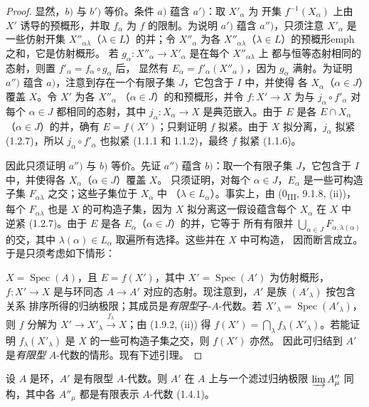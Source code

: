 \begin{proof}
显然，$b)$ 与 $b')$ 等价。条件 $a)$ 蕴含 $a')$：取 $X'_\alpha$ 为
开集 $f^{-1}(X_\alpha)$ 上由 $X'$ 诱导的预概形，并取 $f_\alpha$ 为 $f$
的限制。为说明 $a')$ 蕴含 $a'')$，只须注意 $X'_\alpha$ 是一些仿射开集
$X''_{\alpha\lambda}$（$\lambda\in L$）的并；令 $X''_\alpha$ 为各
$X''_{\alpha\lambda}$（$\lambda\in L$）的预概形emph{之和}，它是仿射概形。
若 $g_\alpha:X''_\alpha\to X'_\alpha$ 是在每个 $X''_{\alpha\lambda}$ 上
都与恒等态射相同的态射，则置 $f'_\alpha=f_\alpha\circ g_\alpha$ 后，
显然有 $E_\alpha=f'_\alpha(X''_\alpha)$，因为 $g_\alpha$ 满射。为证明
$a'')$ 蕴含 $a)$，注意到存在一个有限子集 $J$，它包含于 $I$ 中，并使得
各 $X_\alpha$（$\alpha\in J$）覆盖 $X$。令 $X'$ 为各 $X''_\alpha$
（$\alpha\in J$）的和预概形，并令 $f:X'\to X$ 为与
$j_\alpha\circ f'_\alpha$ 对每个 $\alpha\in J$ 都相同的态射，其中
$j_\alpha:X_\alpha\to X$ 是典范嵌入。由于 $E$ 是各 $E\cap X_\alpha$
（$\alpha\in J$）的并，确有 $E=f(X')$；只剩证明 $f$ 拟紧。由于 $X$
拟分离，$j_\alpha$ 拟紧 (1.2.7)，所以 $j_\alpha\circ f'_\alpha$ 也拟紧
(1.1.1 和 1.1.2)，最终 $f$ 拟紧 (1.1.6)。

因此只须证明 $a'')$ 与 $b)$ 等价。先证 $a'')$ 蕴含 $b)$：取一个有限子集
$J$，它包含于 $I$ 中，并使得各 $X_\alpha$（$\alpha\in J$）覆盖 $X$。
只须证明，对每个 $\alpha\in J$，$E_\alpha$ 是一些可构造子集
$F_{\alpha\lambda}$ 之交；这些子集位于 $X_\alpha$ 中
（$\lambda\in L_\alpha$）。事实上，由
(0\textsubscript{III}, 9.1.8, (ii))，每个 $F_{\alpha\lambda}$ 也是 $X$
的可构造子集，因为 $X$ 拟分离这一假设蕴含每个 $X_\alpha$ 在 $X$ 中
逆紧 (1.2.7)。由于 $E$ 是各 $E_\alpha$（$\alpha\in J$）的并，它等于
所有有限并 $\bigcup_{\alpha\in J}F_{\alpha,\lambda(\alpha)}$ 的交，其中
$\lambda(\alpha)\in L_\alpha$ 取遍所有选择。这些并在 $X$ 中可构造，
因而断言成立。于是只须考虑如下情形：


$X=\operatorname{Spec}(A)$，且 $E=f(X')$，其中
$X'=\operatorname{Spec}(A')$ 为仿射概形，$f:X'\to X$ 是与环同态
$A\to A'$ 对应的态射。现注意到，$A'$ 是族 $(A'_\lambda)$ 按包含关系
排序所得的归纳极限；其成员是\emph{有限型}子-$A$-代数。若
$X'_\lambda=\operatorname{Spec}(A'_\lambda)$，则 $f$ 分解为
$X'\to X'_\lambda\xrightarrow{f_\lambda}X$；由 (1.9.2, (ii)) 得
$f(X')=\bigcap_\lambda f_\lambda(X'_\lambda)$。若能证明
$f_\lambda(X'_\lambda)$ 是 $X$ 的一些可构造子集之交，则 $f(X')$ 亦然。
因此可归结到 $A'$ 是\emph{有限型} $A$-代数的情形。现有下述引理。
\end{proof}

\begin{lemma}[1.9.3.1]
\label{IV.1.9.3.1-fr}
设 $A$ 是环，$A'$ 是有限型 $A$-代数。则 $A'$ 在 $A$ 上与一个滤过归纳极限
$\varinjlim A''_\mu$ 同构，其中各 $A''_\mu$ 都是有限表示
$A$-代数 (1.4.1)。
\end{lemma}

